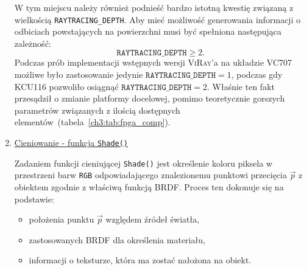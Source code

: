 \begin{enumerate}
W tym miejscu należy również podnieść bardzo istotną kwestię związaną z wielkością \texttt{RAYTRACING\_DEPTH}. Aby mieć możliwość generowania informacji o odbiciach powstających na powierzchni musi być spełniona następująca zależność:
\begin{equation*}
\mathtt{RAYTRACING\_DEPTH} \geq 2.
\end{equation*}
Podczas prób implementacji wstępnych wersji \textsc{ViRay}'a na układzie VC707 możliwe było zastosowanie jedynie $\mathtt{RAYTRACING\_DEPTH} = 1$, podczas gdy KCU116 pozwoliło osiągnąć $\mathtt{RAYTRACING\_DEPTH} = 2$. Właśnie ten fakt przesądził o zmianie platformy docelowej, pomimo teoretycznie gorszych parametrów związanych z ilością dostępnych elementów~(tabela~\ref{ch3:tab:fpga_comp}).


\item \underline{Cieniowanie - funkcja \texttt{Shade()}}

Zadaniem funkcji cieniującej \texttt{Shade()} jest określenie koloru piksela w przestrzeni barw \texttt{RGB} odpowiadającego znalezionemu punktowi przecięcia $\vec{p}$ z obiektem zgodnie z właściwą funkcją BRDF. Proces ten dokonuje się na podstawie:
\begin{itemize}
\item położenia punktu $\vec{p}$ względem źródeł światła,
\item zastosowanych BRDF dla określenia materiału,
\item informacji o teksturze, która ma zostać nałożona na obiekt.
\end{itemize} 


\end{enumerate}
